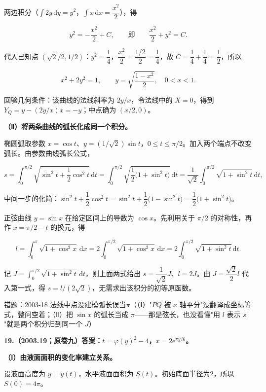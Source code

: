 \documentclass[UTF8,11pt,fontset=windows]{ctexart}
\begin{document}
两边积分（$\int 2y\,\mathrm dy=y^2$，$\int x\,\mathrm dx=\dfrac{x^2}2$），得

$$
y^2=-\frac{x^2}{2}+C,
\qquad\text{即}\qquad
\frac{x^2}{2}+y^2=C.
$$

代入已知点 $(\sqrt2/2,1/2)$：$y^2=\dfrac14$，$\dfrac{x^2}{2}=\dfrac{1/2}{2}=\dfrac14$，故 $C=\dfrac14+\dfrac14=\dfrac12$，所以

$$
\boxed{x^2+2y^2=1},
\qquad y=\sqrt{\frac{1-x^2}{2}},\quad 0<x<1.
$$

回验几何条件：该曲线的法线斜率为 $2y/x$，令法线中的 $X=0$，得到 $Y_Q=y-(2y/x)x=-y$；中点确为 $(x/2,0)$。

\textbf{（Ⅱ）将两条曲线的弧长化成同一个积分。}

椭圆弧取参数 $x=\cos t$、$y=(1/\sqrt2)\sin t$，$0\le t\le\pi/2$。加入两个端点不改变弧长。由参数曲线弧长公式，

$$
s=\int_0^{\pi/2}\sqrt{\sin^2t+\frac12\cos^2t}\,\mathrm dt
=\int_0^{\pi/2}\sqrt{\frac12\bigl(1+\sin^2t\bigr)}\,\mathrm dt
=\frac1{\sqrt2}\int_0^{\pi/2}\sqrt{1+\sin^2t}\,\mathrm dt,
$$

中间一步的化简：$\sin^2t+\dfrac12\cos^2t=\sin^2t+\dfrac12\bigl(1-\sin^2t\bigr)=\dfrac12\bigl(1+\sin^2t\bigr)$。

正弦曲线 $y=\sin x$ 在给定区间上的导数为 $\cos x$。先利用关于 $\pi/2$ 的对称性，再作 $x=\pi/2-t$ 的换元，得

$$
l=\int_0^\pi\sqrt{1+\cos^2x}\,\mathrm dx
=2\int_0^{\pi/2}\sqrt{1+\cos^2x}\,\mathrm dx
=2\int_0^{\pi/2}\sqrt{1+\sin^2t}\,\mathrm dt.
$$

记 $J=\displaystyle\int_0^{\pi/2}\sqrt{1+\sin^2t}\,\mathrm dt$，则上面两式给出 $s=\dfrac1{\sqrt2}J$、$l=2J$。由 $J=\dfrac{\sqrt2}{2}l$ 代入第一式，得 $\boxed{s=l/(2\sqrt2)}$，无需求出该积分的初等原函数。

\begingroup\color{gray}错题：2003-18 法线中点没建模弧长误当$\pi$（（Ⅰ）"$PQ$ 被 $x$ 轴平分"没翻译成坐标等式，整问空着；（Ⅱ）把 $\sin x$ 的弧长当成 $\pi$——那是弦长，也没看懂"用 $l$ 表示 $s$"就是两个积分归到同一个 $J$）\par\endgroup

\clearpage

\textbf{19.（2003.19；原卷九）答案：$t=\varphi(y)^2-4$，$x=2\mathrm e^{\pi y/6}$。}

\textbf{（Ⅰ）由液面面积的变化率建立关系。}

设液面高度为 $y=y(t)$，水平液面面积为 $S(t)$。初始底面半径为2，所以 $S(0)=4\pi$。
\end{document}
